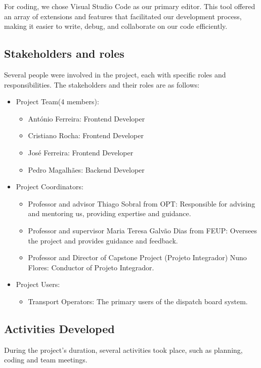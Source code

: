 \documentclass[10pt]{article}
\begin{document}
        For coding, we chose Visual Studio Code as our primary editor. This tool offered an array of extensions and features that facilitated our development process, making it easier to write, debug, and collaborate on our code efficiently.

    \subsection{Stakeholders and roles}
        Several people were involved in the project, each with specific roles and responsibilities. The stakeholders and their roles are as follows:
        \begin{itemize}
            \item Project Team(4 members):
            \begin{itemize}
                \item António Ferreira: Frontend Developer
                \item Cristiano Rocha: Frontend Developer
                \item José Ferreira: Frontend Developer
                \item Pedro Magalhães: Backend Developer
            \end{itemize}
            \item Project Coordinators:
            \begin{itemize}
                \item Professor and advisor Thiago Sobral from OPT: Responsible for advising and mentoring us, providing expertise and guidance.
                \item Professor and supervisor Maria Teresa Galvão Dias from FEUP: Oversees the project and provides guidance and feedback.
                \item Professor and Director of Capstone Project (Projeto Integrador) Nuno Flores: Conductor of Projeto Integrador.
            \end{itemize}
            \item Project Users:
            \begin{itemize}
                \item Transport Operators: The primary users of the dispatch board system.
            \end{itemize}
        \end{itemize}

    \subsection{Activities Developed}
        During the project’s duration, several activities took place, such as planning, coding and team meetings.
\end{document}

